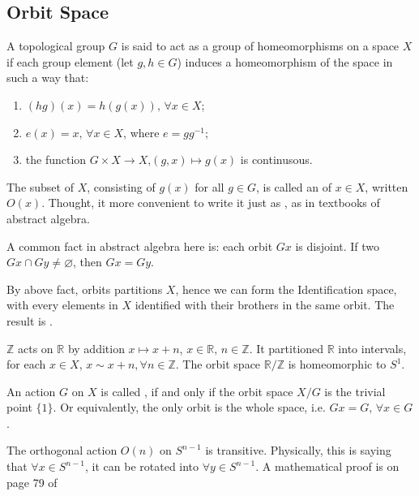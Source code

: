 \documentclass{article}
\begin{document}
\subsection{Orbit Space}
\label{sec:Orbit-Space}
\begin{defi}
    A topological group $G$ is said to act as a group of
    homeomorphisms on a space $X$ if each group element (let $g,h\in G$)
    induces a homeomorphism of the space in such a way that:
    \begin{enumerate}
        \item $(hg)(x) = h(g(x)),\, \forall x\in X$;
        \item $e(x)=x,\, \forall x\in X$, where $e=gg^{-1}$;
        \item the function $G\times X\to X$,$(g,x)\mapsto g(x)$ is
            continusous.
    \end{enumerate}
\end{defi}

The subset of $X$, consisting of $g(x)$ for all $g\in G$, is called an
 of $x\in X$, written $O(x)$. Thought, it more convenient to
write it just as , as in textbooks of abstract algebra.

\begin{fact}
    A common fact in abstract algebra here is: each orbit $Gx$ is
    disjoint. If two $Gx\cap Gy\neq \varnothing$, then $Gx=Gy$.
\end{fact}

By above fact, orbits partitions $X$, hence we can form the
Identification space, with every elements in $X$ identified with their
brothers in the same orbit. The result is .

\begin{ex}
    \label{ex:R-over-Z-T}
    $\mathbb{Z}$ acts on $\mathbb{R}$ by addition $x\mapsto x+n$,
    $x\in \mathbb{R},\,n\in\mathbb{Z}$. It partitioned $\mathbb{R}$
    into intervals, for each $x\in X$, $x\sim x+n,\forall n\in
    \mathbb{Z}$. The orbit space $\mathbb{R}/\mathbb{Z}$ is
    homeomorphic to $S^1$.
\end{ex}

An action $G$ on $X$ is called , if and only if the
orbit space $X/G$ is the trivial point $\{1\}$. Or equivalently, the
only orbit is the whole space, i.e. $Gx=G,\,\forall x\in G$.

\begin{ex}
    The orthogonal action $O(n)$ on $S^{n-1}$ is transitive.
    Physically, this is saying that $\forall x\in S^{n-1}$, it can be
    rotated into $\forall y\in S^{n-1}$. A mathematical proof is on
    page 79 of \cite{book}
\end{ex}
\end{document}
